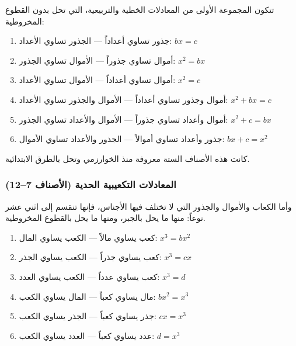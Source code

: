 \documentclass[11pt,a4paper]{book}
\newcommand{\ar}[1]{\leavevmode\arabicfont\beginR #1\endR}
\begin{document}
\ar{تتكون المجموعة الأولى من المعادلات الخطية والتربيعية، التي تحل بدون القطوع المخروطية:}

\begin{enumerate}[label=\arabic*.,noitemsep]
\item \ar{جذور تساوي أعداداً} --- \ar{الجذور تساوي الأعداد}: $bx = c$
\item \ar{أموال تساوي جذوراً} --- \ar{الأموال تساوي الجذور}: $x^2 = bx$
\item \ar{أموال تساوي أعداداً} --- \ar{الأموال تساوي الأعداد}: $x^2 = c$
\item \ar{أموال وجذور تساوي أعداداً} --- \ar{الأموال والجذور تساوي الأعداد}: $x^2 + bx = c$
\item \ar{أموال وأعداد تساوي جذوراً} --- \ar{الأموال والأعداد تساوي الجذور}: $x^2 + c = bx$
\item \ar{جذور وأعداد تساوي أموالاً} --- \ar{الجذور والأعداد تساوي الأموال}: $bx + c = x^2$
\end{enumerate}

\ar{كانت هذه الأصناف الستة معروفة منذ الخوارزمي وتحل بالطرق الابتدائية.}

\subsubsection{\ar{المعادلات التكعيبية الحدية (الأصناف 7--12)}}

\ar{وأما الكعاب والأموال والجذور التي لا تختلف فيها الأجناس، فإنها تنقسم إلى اثني عشر نوعاً: منها ما يحل بالجبر، ومنها ما يحل بالقطوع المخروطية.}

\begin{enumerate}[label=\arabic*.,resume,noitemsep]
\item \ar{كعب يساوي مالاً} --- \ar{الكعب يساوي المال}: $x^3 = bx^2$
\item \ar{كعب يساوي جذراً} --- \ar{الكعب يساوي الجذر}: $x^3 = cx$
\item \ar{كعب يساوي عدداً} --- \ar{الكعب يساوي العدد}: $x^3 = d$
\item \ar{مال يساوي كعباً} --- \ar{المال يساوي الكعب}: $bx^2 = x^3$
\item \ar{جذر يساوي كعباً} --- \ar{الجذر يساوي الكعب}: $cx = x^3$
\item \ar{عدد يساوي كعباً} --- \ar{العدد يساوي الكعب}: $d = x^3$
\end{enumerate}
\end{document}
